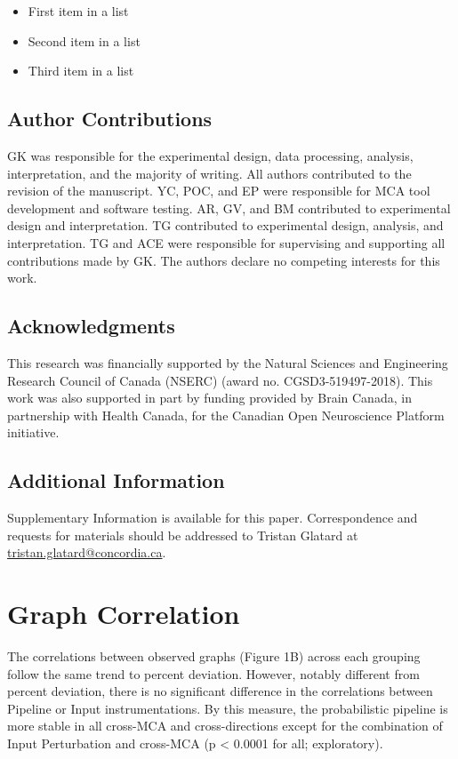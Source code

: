 \documentclass[fleqn,10pt]{SelfArx} %
\begin{document}
\begin{itemize}[noitemsep] %
\item First item in a list
\item Second item in a list
\item Third item in a list
\end{itemize}

\subsection*{Author Contributions}
GK was responsible for the experimental design, data processing, analysis, interpretation, and the majority of writing.
All authors contributed to the revision of the manuscript. YC, POC, and EP were responsible for MCA tool development
and software testing. AR, GV, and BM contributed to experimental design and interpretation. TG contributed to
experimental design, analysis, and interpretation. TG and ACE were responsible for supervising and supporting all
contributions made by GK. The authors declare no competing interests for this work.

\subsection*{Acknowledgments} 
This research was financially supported by the Natural Sciences and Engineering Research Council of Canada (NSERC)
(award no. CGSD3-519497-2018). This work was also supported in part by funding provided by Brain Canada, in partnership
with Health Canada, for the Canadian Open Neuroscience Platform initiative.

\subsection*{Additional Information}
Supplementary Information is available for this paper. Correspondence and requests for materials should be addressed to
Tristan Glatard at \url{tristan.glatard@concordia.ca}.

\beginsupplement

\clearpage
\section{Graph Correlation}
\label{supsec:correlation}
The correlations between observed graphs (Figure 1B) across each grouping follow the same trend to percent deviation.
However, notably different from percent deviation, there is no significant difference in the correlations between
Pipeline or Input instrumentations. By this measure, the probabilistic pipeline is more stable in all cross-MCA and
cross-directions except for the combination of Input Perturbation and cross-MCA (p < 0.0001 for all; exploratory).
\end{document}
